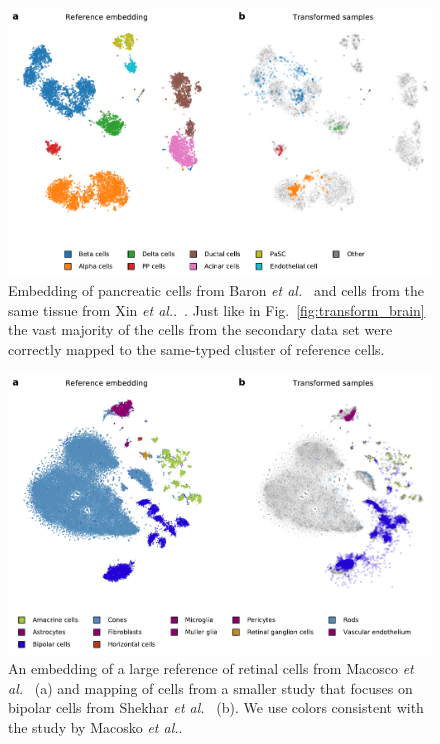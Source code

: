 \documentclass[runningheads]{llncs}
\newcommand{\etal}{\textit{et al.}}
\begin{document}
\begin{figure}[htb]
\includegraphics[width=\textwidth]{figures/transform_pancreas.pdf}
\caption{Embedding of pancreatic cells from Baron \etal~\cite{baron2016} and
cells from the same tissue from Xin \etal.~\cite{xin2016}. Just like in
Fig.~\ref{fig:transform_brain} the vast majority of the cells from the secondary
data set were correctly mapped to the same-typed cluster of reference
cells.}\label{fig:transform_pancreas}
\end{figure}


\begin{figure}[htb]
\includegraphics[width=\textwidth]{figures/transform_retina.pdf}
\caption{An embedding of a large reference of retinal cells from Macosco
\etal~\cite{macosko2015} (a) and mapping of cells from a smaller study that
focuses on bipolar cells from Shekhar \etal~\cite{shekhar2016} (b). We use
colors consistent with the study by Macosko \etal.} \label{fig:transform_retina}
\end{figure}
\end{document}
